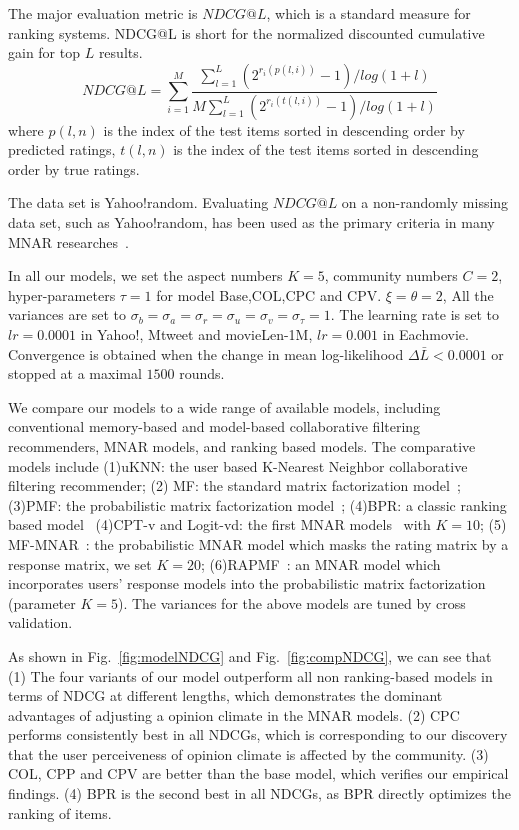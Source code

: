 \documentclass{sig-alternate}
\begin{document}
The major evaluation metric is $NDCG@L$, which is a standard measure for ranking systems.   NDCG@L is short for the normalized discounted cumulative gain for top $L$ results. 
\begin{equation}
NDCG@L=\sum\limits_{i=1}^{M}\frac{\sum_{l=1}^{L}(2^{r_{i}(p(l,i))}-1)/log(1+l)}{M\sum_{l=1}^{L}(2^{r_{i}(t(l,i))}-1)/log(1+l)}
\end{equation}
where $p(l,n)$ is the index of the test items sorted in descending order by predicted ratings, $t(l,n)$ is the index of the test items sorted in descending order by true ratings.

The data set is Yahoo!random. Evaluating $NDCG@L$ on a non-randomly missing data set, such as Yahoo!random, has been used as the primary criteria in many MNAR researches~\cite{Hernandez-Lobato2014Probabilistic,Marlin2009Collaborative}.

In all our models, we set the aspect numbers $K=5$, community numbers $C=2$, hyper-parameters  $\tau=1$ for model Base,COL,CPC and CPV.  $\xi=\theta=2$, All the variances are set to $\sigma_b=\sigma_a=\sigma_r=\sigma_u=\sigma_v=\sigma_\tau=1$. The learning rate is set to $lr=0.0001$ in Yahoo!, Mtweet and movieLen-1M, $lr=0.001$ in Eachmovie. Convergence is obtained when the change in mean log-likelihood $\Delta\bar{L}<0.0001$ or stopped at a maximal $1500$ rounds.


We compare our models to a wide range of available models, including conventional memory-based and model-based collaborative filtering recommenders, MNAR models, and ranking based models. The comparative models include (1)uKNN: the user based K-Nearest Neighbor collaborative filtering recommender; (2) MF: the standard matrix factorization model~\cite{Koren2009Matrix}; (3)PMF: the probabilistic matrix factorization model~\cite{salakhutdinov2008probabilistic}; (4)BPR: a classic ranking based model~\cite{Rendle2009Bayesian} (4)CPT-v and Logit-vd: the first MNAR models~\cite{Marlin2009Collaborative} with $K=10$; (5) MF-MNAR~\cite{Hernandez-Lobato2014Probabilistic}: the probabilistic MNAR model which masks the rating matrix by a response matrix, we set $K=20$; (6)RAPMF~\cite{Yang2015Boosting}: an MNAR model which incorporates users' response models into the probabilistic matrix factorization (parameter $K=5$). The variances for the above models are tuned by cross validation.

As shown in Fig.~\ref{fig:modelNDCG} and Fig.~\ref{fig:compNDCG}, we can see that (1) The four variants of our model outperform all non ranking-based models in terms of NDCG at different lengths, which demonstrates the dominant advantages of adjusting a opinion climate in the MNAR models.  (2) CPC performs consistently best in all NDCGs, which is corresponding to our discovery that the user perceiveness of opinion climate is affected by the community. (3) COL, CPP and CPV are better than the base model, which verifies our empirical findings. (4) BPR is the second best in all NDCGs, as BPR directly optimizes the ranking of items.   
\end{document}
